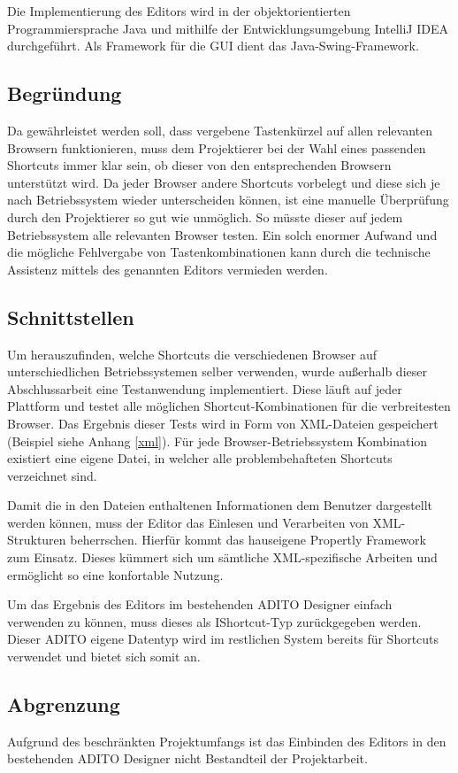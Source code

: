 Die Implementierung des Editors wird in der objektorientierten Programmiersprache Java und mithilfe der Entwicklungsumgebung IntelliJ IDEA durchgeführt. Als Framework für die GUI dient das Java-Swing-Framework.

\subsection{Begründung}

Da gewährleistet werden soll, dass vergebene Tastenkürzel auf allen relevanten Browsern funktionieren, muss dem Projektierer bei der Wahl eines passenden Shortcuts immer klar sein, ob dieser von den entsprechenden Browsern unterstützt wird. Da jeder Browser andere Shortcuts vorbelegt und diese sich je nach Betriebssystem wieder unterscheiden können, ist eine manuelle Überprüfung durch den Projektierer so gut wie unmöglich. So müsste dieser auf jedem Betriebssystem alle relevanten Browser testen. Ein solch enormer Aufwand und die mögliche Fehlvergabe von Tastenkombinationen kann durch die technische Assistenz mittels des genannten Editors vermieden werden.

\subsection{Schnittstellen}
\label{schnittstellen} 

Um herauszufinden, welche Shortcuts die verschiedenen Browser auf unterschiedlichen Betriebssystemen selber verwenden, wurde außerhalb dieser Abschlussarbeit eine Testanwendung implementiert. Diese läuft auf jeder Plattform und testet alle möglichen Shortcut-Kombinationen für die verbreitesten Browser. Das Ergebnis dieser Tests wird in Form von XML-Dateien gespeichert (Beispiel siehe Anhang \ref{xml}). Für jede Browser-Betriebssystem Kombination existiert eine eigene Datei, in welcher alle problembehafteten Shortcuts verzeichnet sind.

Damit die in den Dateien enthaltenen Informationen dem Benutzer dargestellt werden können, muss der Editor das Einlesen und Verarbeiten von XML-Strukturen beherrschen. Hierfür kommt das hauseigene Propertly Framework zum Einsatz. Dieses kümmert sich um sämtliche XML-spezifische Arbeiten und ermöglicht so eine konfortable Nutzung.

Um das Ergebnis des Editors im bestehenden ADITO Designer einfach verwenden zu können, muss dieses als IShortcut-Typ zurückgegeben werden. Dieser ADITO eigene Datentyp wird im restlichen System bereits für Shortcuts verwendet und bietet sich somit an.

\subsection{Abgrenzung}

Aufgrund des beschränkten Projektumfangs ist das Einbinden des Editors in den bestehenden ADITO Designer nicht Bestandteil der Projektarbeit.






\newpage